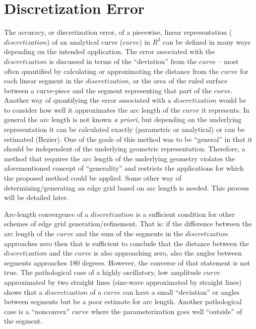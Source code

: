 \section{Discretization Error}
The accuracy, or discretization error, of a piecewise, linear 
representation ($discretization$) of an analytical curve ($curve$) in 
$R^3$ can be defined in many ways depending on the intended application.  
The error associated with the $discretization$ is discussed in terms of 
the ``deviation'' from the $curve$ -- most often quantified by calculating 
or approximating the distance from the $curve$ for each linear segment in 
the $discretization$, or the area of the ruled surface between a 
curve-piece and the segment representing that part of the $curve$.  
Another way of quantifying the error associated with a $discretization$ 
would be to consider how well it approximates the arc length of the 
$curve$ it represents.  In general the arc length is not known {\it{a 
priori}}, 
but depending on the underlying representation it can be calculated 
exactly (parametric or analytical) or can be estimated (Bezier).  One of 
the goals of this method was to be ``general'' in that it should be 
independent of the underlying geometric representation.  Therefore, a 
method that requires the arc length of the underlying geometry violates 
the 
aforementioned concept of ``generality'' and restricts the applications 
for which the proposed method could be applied.  Some other way of 
determining/generating an edge grid based on arc length is needed.  This 
process will be detailed later.

Arc-length convergence of a $discretization$ is a sufficient condition for 
other schemes of edge grid generation/refinement.  That is: if the 
difference between the arc length of the $curve$ and the sum of the 
segments in the $discretization$ approaches zero then that is sufficient 
to conclude that the distance between the $discretization$ and the $curve$ 
is also approaching zero, also the angles between segments approaches 180 
degrees.  However, the converse of that statement is not true.  The 
pathological case of a highly oscillatory, low amplitude $curve$ 
approximated by two straight lines (sine-wave approximated by straight 
lines) shows that a $discretization$ of a $curve$ can have a small 
``deviation'' or angles between segments but be a poor estimate for arc 
length.  Another pathological case is a ``nonconvex'' $curve$ where the 
parameterization goes well ``outside'' of the segment.
